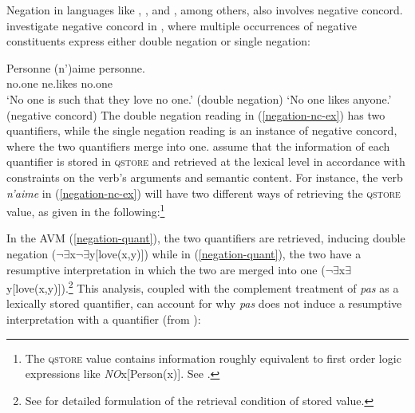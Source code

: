 \documentclass[output=paper
	        ,collection
	        ,collectionchapter
 	        ,biblatex
                ,babelshorthands
                ,newtxmath
                ,draftmode
                ,colorlinks, citecolor=brown
]{langscibook}
\begin{document}
\begin{exe}
\begin{xlist}
Negation in languages like , , and , among others, also involves negative concord.
 investigate  negative concord in , where multiple occurrences
of negative constituents express either
double negation or single negation:

\ea \label{negation-nc-ex}
\gll Personne (n')aime personne.\\
     no.one ne.likes no.one\\
\glt `No one is such that they love no one.' \hfill (double negation)
\glt `No one likes anyone.' \hfill  (negative concord)
\z
%
%
The double negation reading in (\ref{negation-nc-ex}) has two quantifiers, while the single
negation reading is an instance of negative concord, where the two
quantifiers merge into one.  assume that the information of
each quantifier is stored in \textsc{qstore} and retrieved at the
lexical level in accordance with constraints on the verb's arguments and semantic
content. For instance, the verb \textit{n'aime} in (\ref{negation-nc-ex}) will have two different ways of retrieving the
\textsc{qstore} value, as given in the following:\footnote{The
\textsc{qstore} value contains information
roughly equivalent to first order logic expressions like \textit{NO}x[Person(x)]. See \citet{Swart:02}.}

\eal
\ex
{}
\ex
{}
\label{negation-quant}
\zl
%
%
\noindent
In the AVM (\ref{negation-quant}), the two quantifiers are retrieved, inducing double negation ($\neg\exists$x$\neg\exists$y[love(x,y)]) while in (\ref{negation-quant}), the two have a resumptive interpretation in which the two are merged into one ($\neg\exists$x$\exists$y[love(x,y)]).\footnote{See \citet{Swart:02} for detailed formulation of the retrieval condition of stored value.} This analysis, coupled with the complement treatment of \textit{pas} as a lexically stored quantifier, can account
for why \emph{pas} does not induce a resumptive interpretation with a quantifier (from \citealt{Swart:02}):



\end{xlist}
\end{exe}
\end{document}
